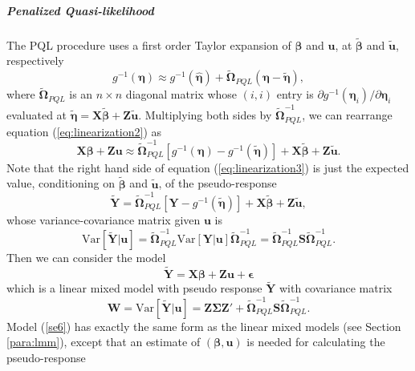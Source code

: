 \subparagraph*{Penalized Quasi-likelihood}
The PQL procedure uses a first order Taylor expansion of $\bm \beta$ and $\bm u$, at $\tilde{\bm
	\beta} $ and $ \tilde{\bm u} $, respectively
\begin{equation}\label{eq:linearization2}
	g^{-1}(\bm\eta) \approx g^{-1}(\hat{\bm \eta}) + \tilde{\bm \Omega}_{PQL}(\bm \eta-\tilde{\bm
		\eta}),
\end{equation} 
where $\tilde{\bm \Omega}_{PQL}$ is an $n\times n$ diagonal matrix whose $(i, i)$ entry is 
$\partial {g^{-1}(\bm \eta_i)}/\partial \bm \eta_i $ evaluated at $\tilde{\bm \eta}= \bm X\tilde{\bm
	\beta} + \bm Z\tilde{\bm u}$. Multiplying both sides by $\bm \tilde{\bm\Omega}_{PQL}^{-1}$,
we can rearrange equation (\ref{eq:linearization2}) as 
\begin{equation}\label{eq:linearization3}
	\bm {X\beta} + \bm {Zu} \approx \tilde{\bm \Omega}_{PQL}^{-1}[g^{-1}(\bm\eta)- g^{-1}(\tilde{\bm
		\eta})]  + \bm{X}\tilde{\bm \beta} + \bm Z\tilde{\bm u}.
\end{equation}
Note that the right hand side of equation (\ref{eq:linearization3}) is just the expected value,
conditioning on $\tilde{\bm \beta}$ and $\tilde{\bm u}$, of the pseudo-response 
\begin{equation}\label{se4}
	\tilde{\bm Y }=\tilde{\bm \Omega}_{PQL}^{-1}[\bm Y- g^{-1}(\tilde{\bm \eta})]  + \bm{X}\tilde{\bm
		\beta} + \bm Z\tilde{\bm u},
\end{equation}
whose variance-covariance matrix given $\bm u$ is 
\begin{equation}\label{se5}
	\text{Var}[\tilde{\bm Y }|\bm u] =\tilde{\bm \Omega}_{PQL}^{-1} \text{Var}[\bm Y|\bm u]\tilde{\bm
		\Omega}_{PQL}^{-1} = 
	\tilde{\bm \Omega}_{PQL}^{-1} \bm S \tilde{\bm \Omega}_{PQL}^{-1}.
\end{equation}
Then we can consider the model 
\begin{equation}\label{se6}
	\tilde{\bm Y } = \bm{X\beta} + \bm {Zu}  + \bm \epsilon
\end{equation}
which is a linear mixed model with pseudo response $\tilde{\bm Y }$ with covariance matrix 
\begin{equation}
	\bm W = \text{Var}[ \tilde{\bm Y } |\bm u] = \bm{Z\Sigma Z'} + \tilde{\bm \Omega}_{PQL}^{-1} \bm S
	\tilde{\bm \Omega}_{PQL}^{-1}.
\end{equation}
Model (\ref{se6})  has exactly the same form as the linear mixed models (see Section 
\ref{para:lmm}),
except that an estimate of $(\bm\beta, \bm u)$  is needed for calculating the pseudo-response
